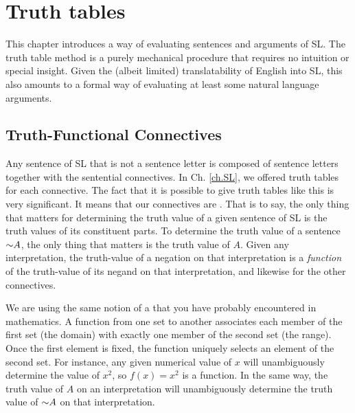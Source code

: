 \chapter{Truth tables}
\label{ch.TruthTables}

This chapter introduces a way of evaluating sentences and arguments of SL. The truth table method is a purely mechanical procedure that requires no intuition or special insight. Given the (albeit limited) translatability of English into SL, this also amounts to a formal way of evaluating at least some natural language arguments.




\section{Truth-Functional Connectives}

Any sentence of SL that is not a sentence letter is composed of sentence letters together with the sentential connectives.
In Ch. \ref{ch.SL}, we offered truth tables for each connective.
The fact that it is possible to give truth tables like this is very significant.
It means that our connectives are .
That is to say, the only thing that matters for determining the truth value of a given sentence of SL is the truth values of its constituent parts.
To determine the truth value of a sentence $\enot A$, the only thing that matters is the truth value of $A$.
Given any interpretation, the truth-value of a negation on that interpretation is a \emph{function} of the truth-value of its negand on that interpretation, and likewise for the other connectives.

We are using the same notion of a  that you have probably encountered in mathematics.
A function from one set to another associates each member of the first set (the domain) with exactly one member of the second set (the range).
Once the first element is fixed, the function uniquely selects an element of the second set.
For instance, any given numerical value of $x$ will unambiguously determine the value of $x^{2}$, so $f(x)=x^{2}$ is a function.
In the same way, the truth value of $A$ on an interpretation will unambiguously determine the truth value of $\enot A$ on that interpretation.

